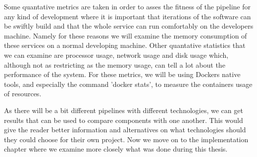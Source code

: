 Some quantative metrics are taken in order to asses the fitness of the pipeline for any kind of development where it is important that iterations of the software can be swiftly build and that the whole service can run comfortably on the developers machine.
Namely for these reasons we will examine the memory consumption of these services on a normal developing machine.
Other quantative statistics that we can examine are processor usage, network usage and disk usage which, although not as restricting as the memory usage, can tell a lot about the performance of the system.
For these metrics, we will be using Dockers native tools, and especially the command 'docker stats', to measure the containers usage of resources.

As there will be a bit different pipelines with different technologies, we can get results that can be used to compare components with one another.
This would give the reader better information and alternatives on what technologies should they could choose for their own project.
Now we move on to the implementation chapter where we examine more closely what was done during this thesis.
